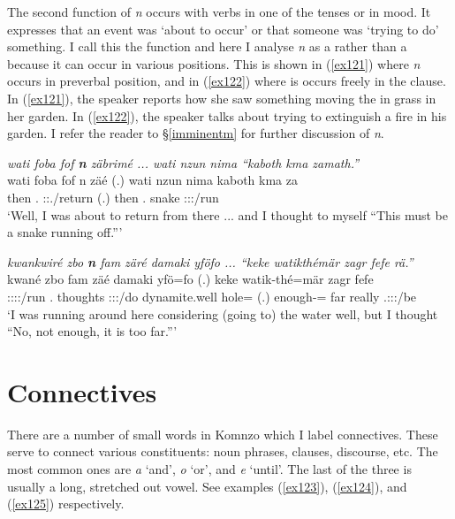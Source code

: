 The second function of \emph{n} occurs with verbs in one of the  tenses or in  mood. It expresses that an event was `about to occur' or that someone was `trying to do' something. I call this the  function and here I analyse \emph{n} as a  rather than a  because it can occur in various positions. This is shown in (\ref{ex121}) where \emph{n} occurs in preverbal position, and in (\ref{ex122}) where is occurs freely in the clause. In (\ref{ex121}), the speaker reports how she saw something moving the in grass in her garden. In (\ref{ex122}), the speaker talks about trying to extinguish a fire in his garden. I refer the reader to \S{}\ref{imminentm} for further discussion of \emph{n}.

\begin{exe}
	\ex \emph{wati foba fof \textbf{n} zäbrimé ... wati nzun nima ``kaboth kma zamath.''}\\
	\gll wati foba fof n zäé (.) wati nzun nima kaboth kma za\\
	then \Dist{}.\Abl{} \Emph{} \Imn{} \Fsg:\Sbj:\Rpst.\Pfv/return (.) then \Fsg{}.\Dat{} \Quot{} snake \Pot{} \Stsg:\Sbj:\Rpst:\Pfv/run\\
	\trans `Well, I was about to return from there ... and I thought to myself ``This must be a snake running off.'''
	\label{ex121}
\end{exe}
\begin{exe}
	\ex \emph{kwankwiré zbo \textbf{n} fam zäré damaki yföfo ... ``keke watikthémär zagr fefe rä.''}\\
	\gll kwané zbo  fam zäé damaki yfö=fo (.) keke watik-thé=mär zagr fefe \\
	\Fsg:\Sbj:\Nonpast:\Ipfv:\Venit/run \Prox{}.\All{} \Imn{} thoughts \Fsg:\Sbj:\Rpst:\Pfv/do dynamite.well hole=\All{} (.) \Neg{} enough-\Adlzr{}=\Priv{} far really \Tsg.\F:\Sbj:\Nonpast:\Ipfv/be\\
	\trans `I was running around here considering (going to) the water well, but I thought ``No, not enough, it is too far.'''
	\label{ex122}
\end{exe}

\section{Connectives} \label{connectives}

There are a number of small words in Komnzo which I label connectives. These serve to connect various constituents: noun phrases, clauses, discourse, etc. The most common ones are \emph{a} `and', \emph{o} `or', and \emph{e} `until'. The last of the three is usually a long, stretched out vowel. See examples (\ref{ex123}), (\ref{ex124}), and (\ref{ex125}) respectively.

